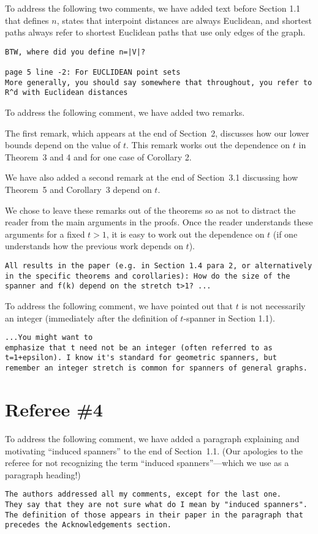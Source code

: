 \documentclass{patmorin}
\begin{document}
To address the following two comments, we have added text before Section 1.1 that defines $n$, states that interpoint distances are always Euclidean, and shortest paths always refer to shortest Euclidean paths that use only edges of the graph.

\begin{Verbatim}[frame=single]
BTW, where did you define n=|V|? 

page 5 line -2: For EUCLIDEAN point sets 
More generally, you should say somewhere that throughout, you refer to 
R^d with Euclidean distances 
\end{Verbatim}

To address the following comment, we have added two remarks.  

The first remark, which appears at the end of Section~2, discusses how our lower bounds depend on the value of $t$.  This remark works out the dependence on $t$ in Theorem~3 and 4 and for one case of Corollary 2.

We have also added a second remark at the end of Section~3.1 discussing how Theorem~5 and Corollary~3 depend on $t$. 

We chose to leave these remarks out of the theorems so as not to distract the reader from the main arguments in the proofs.  Once the reader understands these arguments for a fixed $t>1$, it is easy to work out the dependence on $t$ (if one understands how the previous work depends on $t$).

\begin{Verbatim}[frame=single]
All results in the paper (e.g. in Section 1.4 para 2, or alternatively 
in the specific theorems and corollaries): How do the size of the 
spanner and f(k) depend on the stretch t>1? ...
\end{Verbatim}

To address the following comment, we have pointed out that $t$ is not necessarily an integer (immediately after the definition of $t$-spanner in Section 1.1).

\begin{Verbatim}[frame=single]
...You might want to 
emphasize that t need not be an integer (often referred to as 
t=1+epsilon). I know it's standard for geometric spanners, but 
remember an integer stretch is common for spanners of general graphs. 
\end{Verbatim}

\section*{Referee \#4}

To address the following comment, we have added a paragraph explaining and motivating ``induced spanners'' to the end of Section~1.1. (Our apologies to the referee for not recognizing the term ``induced spanners''---which we use as a paragraph heading!)

\begin{Verbatim}[frame=single]
The authors addressed all my comments, except for the last one.
They say that they are not sure what do I mean by "induced spanners". 
The definition of those appears in their paper in the paragraph that
precedes the Acknowledgements section.
\end{Verbatim}
\end{document}
